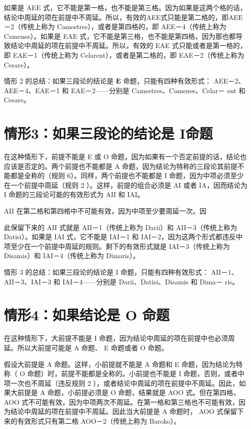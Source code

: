 如果是 AEE 式，它不能是第一格，也不能是第三格。因为如果是这两个格的话，结论中周延的项在前提中不周延。所以，有效的AEE式只能是第二格的，即AEE－2（传统上称为 Camestres），或者是第四格的，即 AEE－4（传统上称为 Camenes）。如果是 EAE 式，它不能是第三格，也不能是第四格，因为那也都导致结论中周延的项在前提中不周延。所以，有效的 EAE 式只能或者是第一格的，即 EAE－1（传统上称为 Celarent），或者是第二格的，即 EAE－2（传统上称为 Cesare）。

情形 2 的总结：如果三段论的结论是 $\mathbf{E}$ 命题，只能有四种有效形式： AEE－2、AEE－4、EAE－1 和 EAE－2——分别是 Camestres、Camenes、Celar－ ent 和 Cesare。

\section*{情形3：如果三段论的结论是 I命题}
在这种情形下，前提不能是 E 或 O 命题，因为如果有一个否定前提的话，结论也应该是否定的。两个前提也不能都是 A 命题，因为结论为特称的三段论其前提不能都是全称的（规则 6）。同样，两个前提也不能都是 I 命题，因为中项必须至少在一个前提中周延（规则 2 ）。这样，前提的组合必须是 AI 或者 IA，因而结论为 I 命题的三段论可能的有效形式为 AII 和 IAI。

AII 在第二格和第四格中不可能有效，因为中项至少要周延一次。因

此保留下来的 AII 式就是 AII－1（传统上称为 Darii）和 AII－3（传统上称为 Datisi）。如果是 IAI 式，它不能是 IAI－1 和 IAI－2，因为这两个形式都违反中项至少在一个前提中周延的规则。剩下的有效形式就是 IAI－3（传统上称为 Disamis）和 IAI－4（传统上称为 Dimaris）。

情形 3 的总结：如果三段论的结论是 I 命题，只能有四种有效形式： AII－1、AII－3、IAI－3 和 IAI－4——分别是 Darii、Datisi、Disamis 和 Dima－ ris。

\section*{情形4：如果结论是 $\mathbf{O}$ 命题}
在这种情形下，大前提不能是 I 命题，因为结论中周延的项在前提中也必须周延。所以大前提可能是 A 命题、 E 命题或者 O 命题。

假设大前提是 A 命题。这样，小前提就不能是 A 命题和 E 命题，因为结论为特称（ O 命题）时，前提不能都是全称的。小前提也不能是 I 命题，否则，或者中项一次也不周延（违反规则 2 ），或者结论中周延的项在前提中不周延。因此，如果大前提是 A 命题，小前提必须是 O 命题，结果就是 AOO 式。但在第四格， AOO 式不可能有效，因为中项两次不周延。在第一格和第三格也不可能有效，因为结论中周延的项在前提中不周延。因此当大前提是 A 命题时， AOO 式保留下来的有效形式只有第二格 AOO－2（传统上称为 Baroko）。

